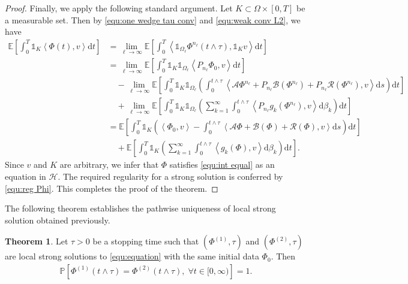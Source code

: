 \documentclass[11pt, reqno]{amsart}
\theoremstyle{definition}
\newtheorem{theorem}{Theorem}[section]
\numberwithin{equation}{section}
\newcommand{\bb}{\mathbb}
\newcommand{\dt}{\mathrm{d}t}
\newcommand{\ds}{\mathrm{d}s}
\newcommand{\inpro}[2]{\left\langle#1,#2\right\rangle}
\newcommand{\one}{\mathds{1}}
\begin{document}
\begin{proof}
Finally, we apply the following standard argument. Let $K\subset \Omega\times [0,T]$ be a measurable set. Then by \eqref{equ:one wedge tau conv} and \eqref{equ:weak conv L2}, we have
\begin{align*}
	\bb{E}\left[\int_0^T \one_K \inpro{\Phi(t)}{v} \dt \right]
	&=
	\lim_{\ell\to\infty} \bb{E}\left[\int_0^T \inpro{\one_{\Omega_\ell} \Phi^{n_\ell}(t\wedge\tau)}{\one_K v} \dt \right]
	\\
	&=
	\lim_{\ell\to\infty} \bb{E} \left[\int_0^T \one_K \one_{\Omega_\ell} \inpro{P_{n_\ell} \Phi_0}{v} \dt \right]
	\\
	&\quad
	- 
	\lim_{\ell\to \infty} \bb{E}\left[ \int_0^T \one_K \one_{\Omega_\ell} \left(\int_0^{t\wedge\tau} \inpro{\mathcal{A}\Phi^{n_\ell}+ P_{n_\ell} \mathcal{B}(\Phi^{n_\ell})+ P_{n_\ell} \mathcal{R}(\Phi^{n_\ell})}{v} \ds \right) \dt\right]
	\\
	&\quad
	+
	\lim_{\ell\to\infty} \bb{E} \left[\int_0^T \one_K \one_{\Omega_\ell} \left(\sum_{k=1}^\infty \int_0^{t\wedge\tau} \inpro{P_{n_\ell} g_k(\Phi^{n_\ell})}{v} \mathrm{d}\beta_k\right) \dt \right]
	\\
	&=
	\bb{E} \left[\int_0^T  \one_K \left(\inpro{\Phi_0}{v} - \int_0^{t\wedge\tau} \inpro{\mathcal{A} \Phi+\mathcal{B}(\Phi) + \mathcal{R}(\Phi)}{v} \ds \right) \dt\right]
	\\
	&\quad
	+ 
	\bb{E}\left[\int_0^T \one_K \left( \sum_{k=1}^\infty \int_0^{t\wedge\tau} \inpro{g_k(\Phi)}{v} \mathrm{d}\beta_k \right) \dt \right].
\end{align*}
Since $v$ and $K$ are arbitrary, we infer that $\Phi$ satisfies \eqref{equ:int equal} as an equation in $\mathcal{H}$. The required regularity for a strong solution is conferred by \eqref{equ:reg Phi}. This completes the proof of the theorem.
\end{proof}

The following theorem establishes the pathwise uniqueness of local strong solution obtained previously.

\begin{theorem}\label{the:unique}
	Let $\tau>0$ be a stopping time such that $(\Phi^{(1)},\tau)$ and $(\Phi^{(2)},\tau)$ are local strong solutions to \eqref{equ:equation} with the same initial data $\Phi_0$. Then
	\begin{align}\label{equ:prob phi t}
		\bb{P} \left[\Phi^{(1)}(t\wedge\tau)= \Phi^{(2)}(t\wedge\tau), \; \forall t\in [0,\infty)\right] = 1.
	\end{align}
\end{theorem}
\end{document}
